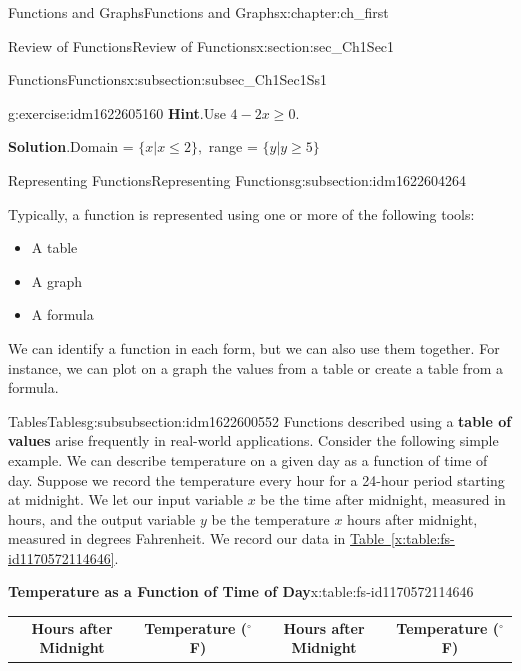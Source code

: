 \documentclass[oneside,10pt,]{book}
\newcommand{\blocktitlefont}{\relax}
\newcommand{\tabularfont}{\relax}
\newcommand{\xreffont}{\relax}
\newcommand{\terminology}[1]{\textbf{#1}}
\numberwithin{equation}{section}
\begin{document}
\begin{chapterptx}{Functions and Graphs}{}{Functions and Graphs}{}{}{x:chapter:ch_first}
\begin{sectionptx}{Review of Functions}{}{Review of Functions}{}{}{x:section:sec_Ch1Sec1}
\begin{subsectionptx}{Functions}{}{Functions}{}{}{x:subsection:subsec_Ch1Sec1Ss1}
\begin{inlineexercise}{}{g:exercise:idm1622605160}
\noindent\textbf{\blocktitlefont Hint}.\hypertarget{g:hint:idm1622606440}{}\quad{}Use \(4-2x\geq0.\)%
\par\smallskip%
\noindent\textbf{\blocktitlefont Solution}.\hypertarget{g:solution:idm1622605800}{}\quad{}Domain = \(\{x|x \leq  2\},\) range = \(\{y|y\geq 5\}\)%
\end{inlineexercise}%
\end{subsectionptx}
%
%
\typeout{************************************************}
\typeout{************************************************}
%
\begin{subsectionptx}{Representing Functions}{}{Representing Functions}{}{}{g:subsection:idm1622604264}
\begin{introduction}{}%
Typically, a function is represented using one or more of the following tools:%
%
\begin{itemize}[label=\textbullet]
\item{}A table%
\item{}A graph%
\item{}A formula%
\end{itemize}
We can identify a function in each form, but we can also use them together. For instance, we can plot on a graph the values from a table or create a table from a formula.%
\end{introduction}%
%
%
\typeout{************************************************}
\typeout{************************************************}
%
\begin{subsubsectionptx}{Tables}{}{Tables}{}{}{g:subsubsection:idm1622600552}
Functions described using a \terminology{table of values} arise frequently in real-world applications. Consider the following simple example. We can describe temperature on a given day as a function of time of day. Suppose we record the temperature every hour for a 24-hour period starting at midnight. We let our input variable \(x\) be the time after midnight, measured in hours, and the output variable \(y\) be the temperature \(x\) hours after midnight, measured in degrees Fahrenheit. We record our data in \hyperref[x:table:fs-id1170572114646]{Table~{\xreffont\ref{x:table:fs-id1170572114646}}}.%
\begin{tableptx}{\textbf{Temperature as a Function of Time of Day}}{x:table:fs-id1170572114646}{}%
\centering%
{\tabularfont%
\begin{tabular}{llll}
\multicolumn{1}{c}{\textbf{Hours after Midnight}}&\multicolumn{1}{c}{\textbf{Temperature  (\(^\circ\)F)}}&\multicolumn{1}{c}{\textbf{Hours after Midnight}}&\multicolumn{1}{c}{\textbf{Temperature  (\(^\circ\)F)}}\tabularnewline[0pt]

\end{tabular}}
\end{tableptx}
\end{subsubsectionptx}
\end{subsectionptx}
\end{sectionptx}
\end{chapterptx}
\end{document}
